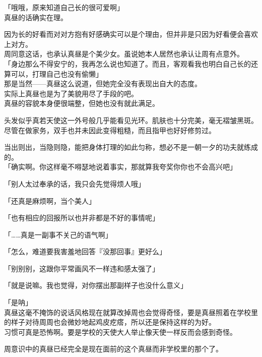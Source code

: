 「哦哦，原来知道自己长的很可爱啊」\\

真昼的话确实在理。

因为长的好看而对对方抱有好感确实可以是个理由，但并非是只因为好看便会喜欢上对方。\\

周同意这话，也承认真昼是个美少女。虽说她本人居然也承认让周有点意外。\\

「身边那么不得安宁的，我再怎么说也知道了。而且，客观看我也明白自己长的还算可以，打理自己也没有偷懒」\\

那是当然——真昼这么说道，但她完全没有表现出自大的态度。\\

实际上真昼也是为了美貌用尽了手段的吧。\\

真昼的容貌本身便很端整，但她也没有就此满足。

头发似乎真若天使这一外号般几乎能看见光环。肌肤也十分完美，毫无褶皱黑斑。尽管在做家务，双手也并未因此变得粗糙，而且指甲也好好修剪过。

当出则出，当隐则隐，能把身体打理的如此匀称，想必不是一朝一夕的功夫就练成的。\\

「确实啊。你这样毫不嘚瑟地说着事实，那就算我夸奖你你也不会高兴吧」

「别人太过奉承的话，我只会先觉得烦人哦」

「还真是麻烦啊，当个美人」

「也有相应的回报所以也并非都是不好的事情呢」

「……真是一副事不关己的语气啊」

「怎么，难道要我害羞地回答『没那回事』更好么」

「别别别，这跟你平常画风不一样违和感太强了」

「就是说嘛。我也觉得，对你摆出那副样子也没什么意义」

「是呐」\\

真昼这毫不掩饰的说话风格现在就算改掉周也会觉得奇怪，要是真昼照着在学校里的样子对待周周也会微妙地起鸡皮疙瘩，所以还是保持这样的为好。\\

习惯可真是恐怖啊。要是学校的天使大人举止像天使一样反而会感到奇怪。

周意识中的真昼已经完全是现在面前的这个真昼而非学校里的那个了。\\

